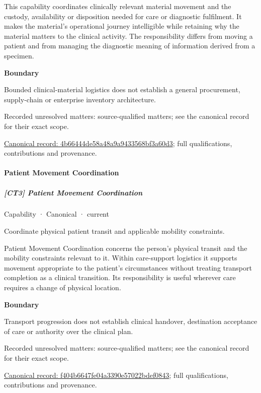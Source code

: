 This capability coordinates clinically relevant material movement and the custody, availability or disposition needed for care or diagnostic fulfilment. It makes the material's operational journey intelligible while retaining why the material matters to the clinical activity. The responsibility differs from moving a patient and from managing the diagnostic meaning of information derived from a specimen.



\textbf{Boundary}



Bounded clinical-material logistics does not establish a general procurement, supply-chain or enterprise inventory architecture.


{\small Recorded unresolved matters: source-qualified matters; see the canonical record for their exact scope.}\par
{\footnotesize \href{../../../../continuum/strategy/capability/4b66444de58a48a9a9433568bf3a60d3.md}{Canonical record: 4b66444de58a48a9a9433568bf3a60d3}; full qualifications, contributions and provenance.}\par
\paragraph{Patient Movement Coordination}

\subparagraph{[CT3] Patient Movement Coordination}

\label{element:f404b6647fe04a3390e57022bdef0843}
{\small Capability · Canonical · current}\par

Coordinate physical patient transit and applicable mobility constraints.



Patient Movement Coordination concerns the person's physical transit and the mobility constraints relevant to it. Within care-support logistics it supports movement appropriate to the patient's circumstances without treating transport completion as a clinical transition. Its responsibility is useful wherever care requires a change of physical location.



\textbf{Boundary}



Transport progression does not establish clinical handover, destination acceptance of care or authority over the clinical plan.


{\small Recorded unresolved matters: source-qualified matters; see the canonical record for their exact scope.}\par
{\footnotesize \href{../../../../continuum/strategy/capability/f404b6647fe04a3390e57022bdef0843.md}{Canonical record: f404b6647fe04a3390e57022bdef0843}; full qualifications, contributions and provenance.}\par
